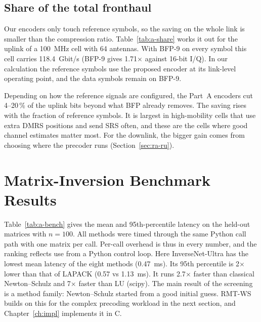 \subsection{Share of the total fronthaul}
\label{sec:ra-share}

Our encoders only touch reference symbols, so the saving on the whole link is smaller than the compression ratio. Table~\ref{tab:a-share} works it out for the uplink of a 100~MHz cell with 64 antennas. With BFP-9 on every symbol this cell carries 118.4~Gbit/s (BFP-9 gives 1.71$\times$ against 16-bit I/Q). In our calculation the reference symbols use the proposed encoder at its link-level operating point, and the data symbols remain on BFP-9.

\begin{table}[H]
\caption{Saving on the total uplink fronthaul (118.4~Gbit/s with BFP-9; 100~MHz, $M=64$) when only reference-symbol IQ is compressed.}
\label{tab:a-share}
\centering
{}
\end{table}

Depending on how the reference signals are configured, the Part~A encoders cut 4--20\,\% of the uplink bits beyond what BFP already removes. The saving rises with the fraction of reference symbols. It is largest in high-mobility cells that use extra DMRS positions and send SRS often, and these are the cells where good channel estimates matter most. For the downlink, the bigger gain comes from choosing where the precoder runs (Section~\ref{sec:ra-ru}).

\section{Matrix-Inversion Benchmark Results}
\label{sec:ra-bench}

Table~\ref{tab:a-bench} gives the mean and 95th-percentile latency on the held-out matrices with $n = 100$. All methods were timed through the same Python call path with one matrix per call. Per-call overhead is thus in every number, and the ranking reflects use from a Python control loop. Here InverseNet-Ultra has the lowest mean latency of the eight methods (0.47~ms). Its 95th percentile is 2$\times$ lower than that of LAPACK (0.57 vs 1.13~ms). It runs 2.7$\times$ faster than classical Newton--Schulz and 7$\times$ faster than LU (scipy). The main result of the screening is a method family: Newton--Schulz started from a good initial guess. RMT-WS builds on this for the complex precoding workload in the next section, and Chapter~\ref{ch:impl} implements it in C.

